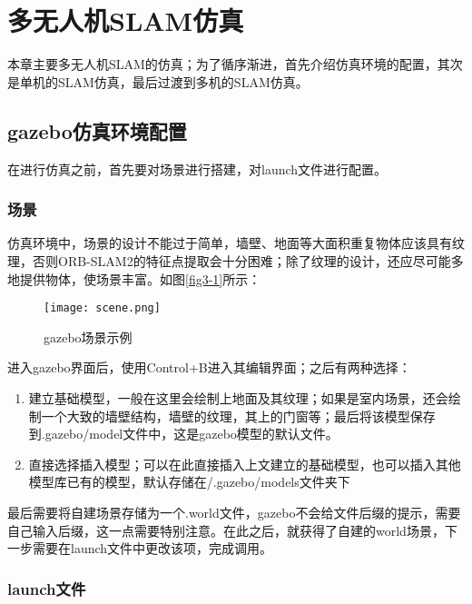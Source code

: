 \renewcommand{\baselinestretch}{1.5}
\fontsize{12pt}{13pt}\selectfont

\chapter{多无人机SLAM仿真} \label{Simulation}

本章主要多无人机SLAM的仿真；为了循序渐进，首先介绍仿真环境的配置，其次是单机的SLAM仿真，最后过渡到多机的SLAM仿真。


\section{gazebo仿真环境配置}

在进行仿真之前，首先要对场景进行搭建，对launch文件进行配置。

\subsection{场景} \label{4.1.1}

仿真环境中，场景的设计不能过于简单，墙壁、地面等大面积重复物体应该具有纹理，否则ORB-SLAM2的特征点提取会十分困难；除了纹理的设计，还应尽可能多地提供物体，使场景丰富。如图\ref{fig3-1}所示：

\begin{figure}[!ht]
	\centering
	\texttt{[image: scene.png]}
	\caption{gazebo场景示例}
	\label{fig4-1}
\end{figure}

进入gazebo界面后，使用Control+B进入其编辑界面；之后有两种选择：

\begin{enumerate}
	\item 建立基础模型，一般在这里会绘制上地面及其纹理；如果是室内场景，还会绘制一个大致的墙壁结构，墙壁的纹理，其上的门窗等；最后将该模型保存到.gazebo/model文件中，这是gazebo模型的默认文件。
	\item 直接选择插入模型；可以在此直接插入上文建立的基础模型，也可以插入其他模型库已有的模型，默认存储在/.gazebo/models文件夹下
\end{enumerate}

最后需要将自建场景存储为一个.world文件，gazebo不会给文件后缀的提示，需要自己输入后缀，这一点需要特别注意。在此之后，就获得了自建的world场景，下一步需要在launch文件中更改该项，完成调用。


\subsection{launch文件} \label{4.1.2}

